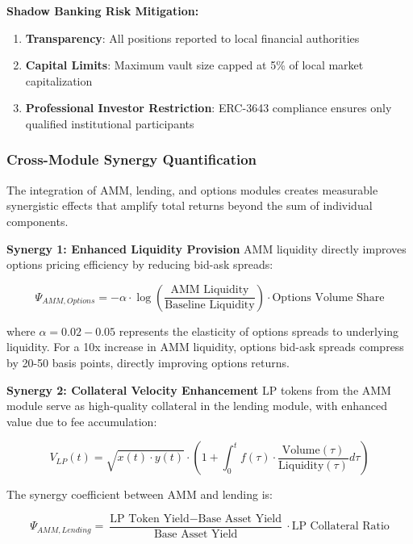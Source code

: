\documentclass[12pt]{article}
\begin{document}
\textbf{Shadow Banking Risk Mitigation:}
\begin{enumerate}
\item \textbf{Transparency}: All positions reported to local financial authorities
\item \textbf{Capital Limits}: Maximum vault size capped at 5\% of local market capitalization
\item \textbf{Professional Investor Restriction}: ERC-3643 compliance ensures only qualified institutional participants
\end{enumerate}

\subsubsection{Cross-Module Synergy Quantification}

The integration of AMM, lending, and options modules creates measurable synergistic effects that amplify total returns beyond the sum of individual components.

\textbf{Synergy 1: Enhanced Liquidity Provision}
AMM liquidity directly improves options pricing efficiency by reducing bid-ask spreads:

\begin{equation}
\Psi_{AMM,Options} = -\alpha \cdot \log\left(\frac{\text{AMM Liquidity}}{\text{Baseline Liquidity}}\right) \cdot \text{Options Volume Share}
\end{equation}

where $\alpha = 0.02-0.05$ represents the elasticity of options spreads to underlying liquidity. For a 10x increase in AMM liquidity, options bid-ask spreads compress by 20-50 basis points, directly improving options returns.

\textbf{Synergy 2: Collateral Velocity Enhancement}
LP tokens from the AMM module serve as high-quality collateral in the lending module, with enhanced value due to fee accumulation:

\begin{equation}
V_{LP}(t) = \sqrt{x(t) \cdot y(t)} \cdot \left(1 + \int_0^t f(\tau) \cdot \frac{\text{Volume}(\tau)}{\text{Liquidity}(\tau)} d\tau\right)
\end{equation}

The synergy coefficient between AMM and lending is:

\begin{equation}
\Psi_{AMM,Lending} = \frac{\text{LP Token Yield} - \text{Base Asset Yield}}{\text{Base Asset Yield}} \cdot \text{LP Collateral Ratio}
\end{equation}
\end{document}
